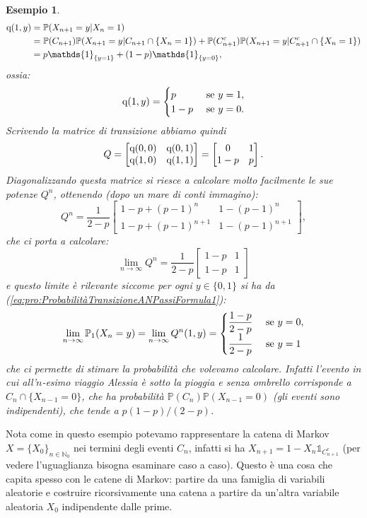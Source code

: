 \documentclass[11pt]{book}
\theoremstyle{Definizione}
\theoremstyle{TeoremaProposizioneLemmaCorollario}
\theoremstyle{OsservazioneNota}
\newtheorem{myes}{Esempio}[section]
\newcommand{\N}{\mathbb{N}}
\renewcommand{\P}{\mathbb{P}}
\newcommand{\q}{\textup{q}}
\newcommand{\uno}[1]{\mathds{1}_{#1}}
\begin{document}
\begin{myes}
\begin{align*}
\q(1,y) &= \P(X_{n+1} = y| X_n = 1) \\
&=\P(C_{n+1})\P(X_{n+1} = y|C_{n+1}\cap\{ X_n = 1\}) + \P(C_{n+1}^c)\P(X_{n+1} = y| C_{n+1}^c\cap \{ X_n = 1\}) \\
&= p\uno{\{y = 1\}}+(1-p)\uno{\{ y = 0\}},
\end{align*}
ossia:
$$
\q(1,y) = \begin{cases}
p &\textup{ se }y = 1,\\
1-p&\textup{ se }y = 0.
\end{cases}
$$
Scrivendo la matrice di transizione abbiamo quindi
$$
Q = \begin{bmatrix}
\q(0,0) & \q(0,1) \\
\q(1,0) & \q(1,1)
\end{bmatrix} = \begin{bmatrix}
0 & 1 \\
1-p & p
\end{bmatrix}.
$$
Diagonalizzando questa matrice si riesce a calcolare molto facilmente le sue potenze $Q^n$, ottenendo (dopo un mare di conti immagino):
$$
Q^n = \frac{1}{2-p}\begin{bmatrix}
1-p+(p-1)^n & 1-(p-1)^n\\
1-p+(p-1)^{n+1} & 1-(p-1)^{n+1}
\end{bmatrix},
$$
che ci porta a calcolare:
$$
\lim_{n \to \infty} Q^n = \frac{1}{2-p}\begin{bmatrix}
1-p & 1 \\
1-p & 1
\end{bmatrix}
$$
e questo limite è rilevante siccome per ogni $y\in \{0,1\}$ si ha da (\ref{eq:pro:ProbabilitàTransizioneANPassiFormula1}):
$$
\lim_{n\to \infty} \P_1(X_n = y) = \lim_{n \to \infty} Q^n(1,y) = \begin{cases}
\displaystyle \frac{1-p}{2-p} &\textup{ se }y = 0,\\
\displaystyle \frac{1}{2-p} &\textup{ se }y = 1
\end{cases}
$$
che ci permette di stimare la probabilità che volevamo calcolare. Infatti l'evento in cui all'$n$-esimo viaggio Alessia è sotto la pioggia e senza ombrello corrisponde a $C_n \cap \{X_{n-1} = 0\}$, che ha probabilità $\P(C_n) \P(X_{n-1} = 0)$ (gli eventi sono indipendenti), che tende a $p(1-p)/(2-p)$.
\end{myes}
Nota come in questo esempio potevamo rappresentare la catena di Markov $X = \{X_0\}_{n\in \N_0}$ nei termini degli eventi $C_n$, infatti si ha $X_{n+1} =1-X_n \uno{C_{n+1}^c}$ (per vedere l'uguaglianza bisogna esaminare caso a caso). Questo è una cosa che capita spesso con le catene di Markov: partire da una famiglia di variabili aleatorie e costruire ricorsivamente una catena a partire da un'altra variabile aleatoria $X_0$ indipendente dalle prime.
\end{document}
